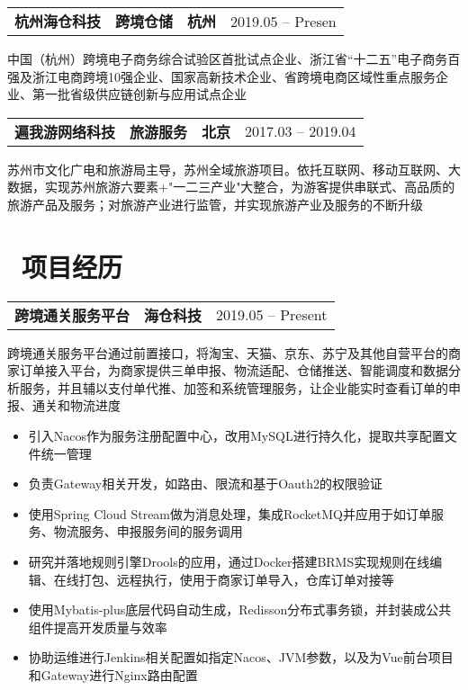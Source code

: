 \documentclass{resume}
\begin{document}
	\begin{tabularx}{\textwidth}{@{}X X X r@{}}
		\textbf{杭州海仓科技} & \textbf{       跨境仓储} & \textbf{杭州}   & 2019.05 -- Presen   \\
	\end{tabularx}
	
		中国（杭州）跨境电子商务综合试验区首批试点企业、浙江省“十二五”电子商务百强及浙江电商跨境10强企业、国家高新技术企业、省跨境电商区域性重点服务企业、第一批省级供应链创新与应用试点企业

	\begin{tabularx}{\textwidth}{@{}X X X r@{}}
		\textbf{遍我游网络科技}  & \textbf{         旅游服务}  & \textbf{  北京} & 2017.03 -- 2019.04\\
	\end{tabularx}

		苏州市文化广电和旅游局主导，苏州全域旅游项目。依托互联网、移动互联网、大数据，实现苏州旅游六要素+"一二三产业"大整合，为游客提供串联式、高品质的旅游产品及服务；对旅游产业进行监管，并实现旅游产业及服务的不断升级

	
	
	\section{\faGraduationCap\ 项目经历}
	
	\begin{tabularx}{\textwidth}{@{}X X r@{}}
		\textbf{跨境通关服务平台} & \textbf{海仓科技} & 2019.05 -- Present \\
	\end{tabularx}
	跨境通关服务平台通过前置接口，将淘宝、天猫、京东、苏宁及其他自营平台的商家订单接入平台，为商家提供三单申报、物流适配、仓储推送、智能调度和数据分析服务，并且辅以支付单代推、加签和系统管理服务，让企业能实时查看订单的申报、通关和物流进度
	\begin{itemize}
		\item 引入Nacos作为服务注册配置中心，改用MySQL进行持久化，提取共享配置文件统一管理
		\item 负责Gateway相关开发，如路由、限流和基于Oauth2的权限验证
		\item 使用Spring Cloud Stream做为消息处理，集成RocketMQ并应用于如订单服务、物流服务、申报服务间的服务调用
		\item 研究并落地规则引擎Drools的应用，通过Docker搭建BRMS实现规则在线编辑、在线打包、远程执行，使用于商家订单导入，仓库订单对接等
		\item  使用Mybatis-plus底层代码自动生成，Redisson分布式事务锁，并封装成公共组件提高开发质量与效率
		\item 协助运维进行Jenkins相关配置如指定Nacos、JVM参数，以及为Vue前台项目和Gateway进行Nginx路由配置
	\end{itemize}
	
\end{document}
